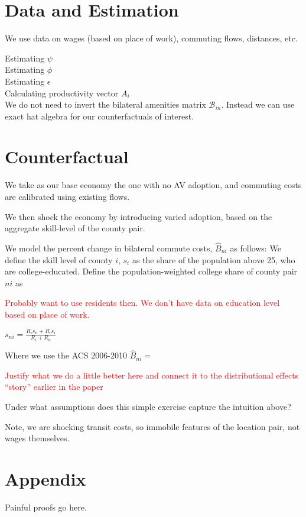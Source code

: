 \documentclass{article}
\begin{document}
\section{Data and Estimation}
We use data on wages (based on place of work), commuting flows, distances, etc.



Estimating $\psi$ \\
Estimating $\phi$ \\ 
Estimating $\epsilon$ \\
Calculating productivity vector $A_i$ \\


We do not need to invert the bilateral amenities matrix $\mathcal{B}_{in}$. Instead we can use exact hat algebra for our counterfactuals of interest. 




\section{Counterfactual}

We take as our base economy the one with no AV adoption, and commuting costs are calibrated using existing flows.

We then shock the economy by introducing varied adoption, based on the aggregate skill-level of the county pair.



We model the percent change in bilateral commute costs, $\hat B_{ni}$ as follows:
We define the skill level of county $i$, $s_i$ as the share of the population above 25, who are college-educated.
Define the population-weighted college share of county pair $ni$ as 

\textcolor{red}{Probably want to use residents then. We don't have data on education level based on place of work.}

$s_{ni} = \frac{R_i s_n + R_i s_i}{R_i + R_n} $

Where we use the ACS 2006-2010  
$\hat B_{ni} =  $


\textcolor{red}{Justify what we do a little better here and connect it to the distributional effects ``story'' earlier in the paper}

Under what assumptions does this simple exercise capture the intuition above? 

Note, we are shocking transit costs, so immobile features of the location pair, not wages themselves. 



\section{Appendix}
Painful proofs go here.


\end{document}
